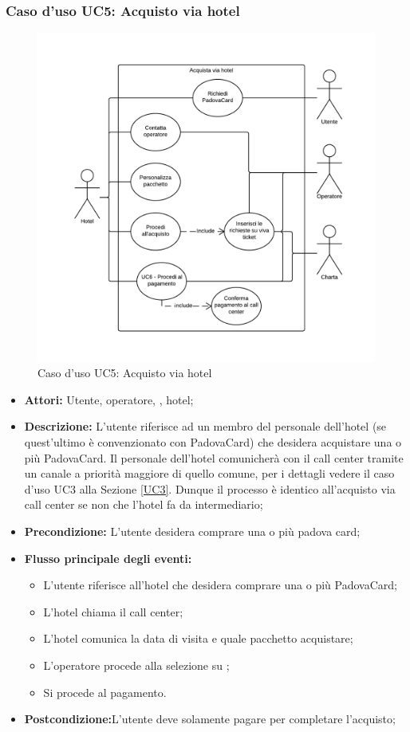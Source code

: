 \subsubsection{Caso d'uso UC5: Acquisto via hotel}\label{UCF5}
\begin{figure}[H]
\centering
\includegraphics[width=1\textwidth]{images/UC5.png}
\caption{Caso d'uso UC5: Acquisto via hotel}
\end{figure}
\begin{itemize}
\item \textbf{Attori:} Utente, operatore, \charta, hotel;
\item \textbf{Descrizione:} L'utente riferisce ad un membro del personale dell'hotel (se quest'ultimo è convenzionato con PadovaCard) che desidera acquistare una o più PadovaCard. Il personale dell'hotel comunicherà con il call center tramite un canale a priorità maggiore di quello comune, per i dettagli vedere il caso d'uso UC3 alla Sezione \ref{UC3}. Dunque il processo è identico all'acquisto via call center se non che l'hotel fa da intermediario;
\item \textbf{Precondizione:} L'utente desidera comprare una o più padova card;
\item \textbf{Flusso principale degli eventi:}
	\begin{itemize}
    	\item L'utente riferisce all'hotel che desidera comprare una o più PadovaCard;
		\item L'hotel chiama il call center;
		\item L'hotel comunica la data di visita e quale pacchetto acquistare;
        \item L'operatore procede alla selezione su \tlite;
        \item Si procede al pagamento.
	\end{itemize}
\item \textbf{Postcondizione:}L'utente deve solamente pagare per completare l'acquisto;
\end{itemize}

